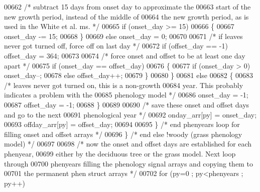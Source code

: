 \begin{DoxyCode}
{{{00662                     \textcolor{comment}{/* subtract 15 days from onset day to approximate the}
00663 \textcolor{comment}{                    start of the new growth period, instead of the middle of}
00664 \textcolor{comment}{                    the new growth period, as is used in the White et al. ms. */}
00665                     \textcolor{keywordflow}{if} (onset\_day >= 15)
00666                     \{
00667                         onset\_day -= 15;
00668                     \}
00669                     \textcolor{keywordflow}{else} onset\_day = 0;
00670 
00671                     \textcolor{comment}{/* if leaves never got turned off, force off on last day */}
00672                     \textcolor{keywordflow}{if} (offset\_day == -1) offset\_day = 364;
00673 
00674                     \textcolor{comment}{/* force onset and offset to be at least one day apart */}
00675                     \textcolor{keywordflow}{if} (onset\_day == offset\_day)
00676                     \{
00677                         \textcolor{keywordflow}{if} (onset\_day > 0) onset\_day--;
00678                         \textcolor{keywordflow}{else} offset\_day++;
00679                     \}
00680                 \}
00681                 \textcolor{keywordflow}{else}
00682                 \{
00683                     \textcolor{comment}{/* leaves never got turned on, this is a non-growth}
00684 \textcolor{comment}{                    year.  This probably indicates a problem with the}
00685 \textcolor{comment}{                    phenology model */}
00686                     onset\_day = -1;
00687                     offset\_day = -1;
00688                 \}
00689                 
00690                 \textcolor{comment}{/* save these onset and offset days and go to the next}
00691 \textcolor{comment}{                phenological year */}
00692                 onday\_arr[py] = onset\_day;
00693                 offday\_arr[py] = offset\_day;
00694                 
00695             \} \textcolor{comment}{/* end phenyears loop for filling onset and offset arrays */}
00696         \} \textcolor{comment}{/* end else !woody (grass phenology model) */}
00697         
00698         \textcolor{comment}{/* now the onset and offset days are established for each phenyear,}
00699 \textcolor{comment}{        either by the deciduous tree or the grass model.  Next loop through}
00700 \textcolor{comment}{        phenyears filling the phenology signal arrays and copying them to }
00701 \textcolor{comment}{        the permanent phen struct arrays */}
00702         \textcolor{keywordflow}{for} (py=0 ; py<phenyears ; py++)
}}}
\end{DoxyCode}
